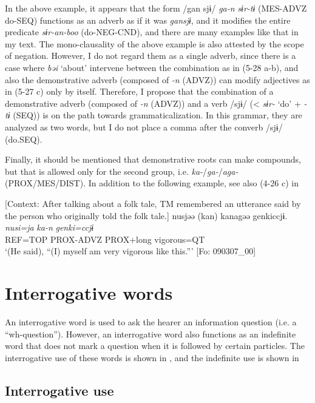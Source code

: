 In the above example, it appears that the form /gan sjɨ/ \textit{ga-n} \textit{sɨr-tɨ} (MES-ADVZ do-SEQ) functions as an adverb as if it was \textit{gansjɨ}, and it modifies the entire predicate \textit{sɨr-an-boo} (do-NEG-CND), and there are many examples like that in my text. The mono-clausality of the above example is also attested by the scope of negation. However, I do not regard them as a single adverb, since there is a case where \textit{bəi} ‘about’ intervene between the combination as in (5-28 a-b), and also the demonstrative adverb (composed of \textit{{}-n} (ADVZ)) can modify adjectives as in (5-27 c) only by itself. Therefore, I propose that the combination of a demonstrative adverb (composed of \textit{{}-n} (ADVZ)) and a verb /sjɨ/ (< \textit{sɨr-} ‘do’ + \textit{{}-tɨ} (SEQ)) is on the path towards grammaticalization. In this grammar, they are analyzed as two words, but I do not place a comma after the converb /sjɨ/ (do.SEQ).

  Finally, it should be mentioned that demonstrative roots can make compounds, but that is allowed only for the second group, i.e. \textit{ka-}/\textit{ga-}/\textit{aga-} (PROX/MES/DIST). In addition to the following example, see also (4-26 c) in 

\ea \label{ex:5:30}   [Context: After talking about a folk tale, TM remembered an utterance said by the person who originally told the folk tale.]
\glll  nusjəə  (kan)  kanagəə  {\textbar}genki{\textbar}ccjɨ.\\
\textit{nusi=ja}  \textit{ka-n}  \textit{}  \textit{genki=ccjɨ}\\
REF=TOP  PROX-ADVZ  PROX+long  vigorous=QT\\
\glt ‘(He said), “(I) myself am very vigorous like this.”’ [Fo: 090307\_00]
\z

\section{Interrogative words}
\label{sec:key:5.3}
An interrogative word is used to ask the hearer an information question (i.e. a “wh-question”). However, an interrogative word also functions as an indefinite word that does not mark a question when it is followed by certain particles. The interrogative use of these words is shown in , and the indefinite use is shown in 

\subsection{Interrogative use}

